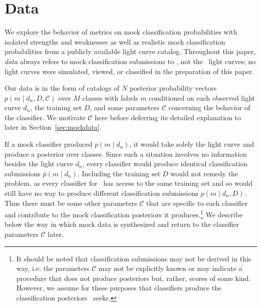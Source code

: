 \section{Data}
\label{sec:data}

We explore the behavior of metrics on mock classification probabilities with isolated strengths and weaknesses as well as realistic mock classification probabilities from a publicly available light curve catalog.
Throughout this paper, \textit{data} always refers to mock classification submissions to \plasticc, not the \plasticc\ light curves; no light curves were simulated, viewed, or classified in the preparation of this paper.

Our data is in the form of catalogs of $N$ posterior probability vectors $p(m \mid d_{n}, D, \mathcal{C})$ over $M$ classes with labels $m$ conditioned on each observed light curve $d_{n}$, the training set $D$, and some parameters $\mathcal{C}$ concerning the behavior of the classifier.
We motivate $\mathcal{C}$ here before deferring its detailed explanation to later in Section~\ref{sec:mockdata}.

If a mock classifier produced $p(m \mid d_{n})$, it would take solely the light curve and produce a posterior over classes.
Since such a situation involves no information besides the light curve $d_{n}$, every classifier would produce identical classification submissions $\bar{p}(m \mid d_{n})$.
Including the training set $D$ would not remedy the problem, as every classifier for \plasticc\ has access to the same training set and so would still have no way to produce different classification submissions $p(m \mid d_{n}, D)$.
Thus there must be some other parameters $\mathcal{C}$ that are specific to each classifier and contribute to the mock classification posteriors it produces.\footnote{It should be noted that classification submissions may not be derived in this way, i.e. the parameters $\mathcal{C}$ may not be explicitly known or may indicate a procedure that does not produce posteriors but, rather, scores of some kind.  However, we assume for these purposes that classifiers produce the classification posteriors \plasticc\ seeks.}
We describe below the way in which mock data is synthesized and return to the classifier parameters $\mathcal{C}$ later.

